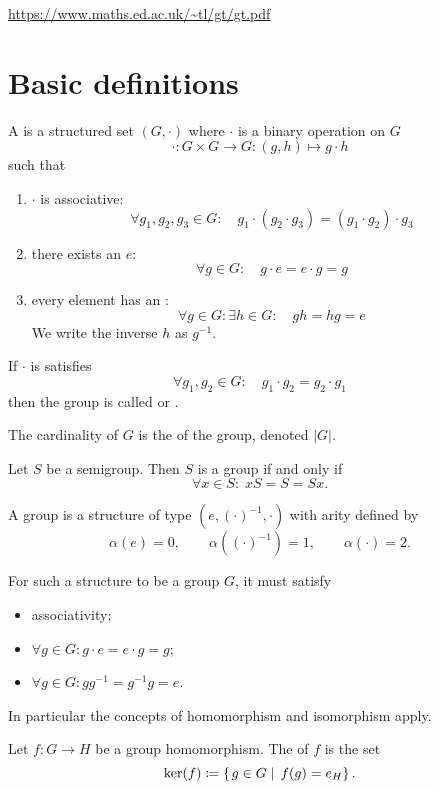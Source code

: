 \url{https://www.maths.ed.ac.uk/~tl/gt/gt.pdf}

\section{Basic definitions}

\begin{definition}
A  is a structured set $(G,\boldsymbol{\cdot})$ where $\boldsymbol{\cdot}$ is a binary operation on $G$
\[\boldsymbol{\cdot}: G\times G \to G: (g,h)\mapsto g\cdot h\]
such that
\begin{enumerate}
\item $\boldsymbol{\cdot}$ is associative:
\[ \forall g_1,g_2,g_3 \in G: \quad g_1\cdot (g_2\cdot g_3) = (g_1\cdot g_2)\cdot g_3 \]
\item there exists an  $e$:
\[ \forall g\in G: \quad g\cdot e = e\cdot g = g \]
\item every element has an :
\[ \forall g\in G: \exists h \in G: \quad  gh = hg = e \]
We write the inverse $h$ as $g^{-1}$. 
\end{enumerate}
If $\boldsymbol{\cdot}$ is satisfies
\[ \forall g_1, g_2 \in G: \quad g_1 \cdot g_2 = g_2\cdot g_1 \]
then the group is called  or .

The cardinality of $G$ is the  of the group, denoted $|G|$.
\end{definition}

\begin{lemma}
Let $S$ be a semigroup. Then $S$ is a group \textup{if and only if}
\[ \forall x\in S: \; xS = S = Sx. \]
\end{lemma}

\begin{lemma}
A group is a structure of type $(e, (\cdot)^{-1}, \boldsymbol{\cdot})$ with arity defined by
\[ \alpha(e) = 0, \qquad \alpha((\cdot)^{-1}) = 1, \qquad \alpha(\boldsymbol{\cdot}) = 2. \]
\end{lemma}
For such a structure to be a group $G$, it must satisfy
\begin{itemize}
\item associativity;
\item $\forall g\in G: g\cdot e = e\cdot g = g$;
\item $\forall g\in G: gg^{-1} = g^{-1}g = e$.
\end{itemize}
In particular the concepts of homomorphism and isomorphism apply.

\begin{definition}
Let $f:G\to H$ be a group homomorphism. The  of $f$ is the set
\[ \ker(f) \coloneqq \left\{\left. g\in G \;\right|\; f(g)=e_H \right\}. \]
\end{definition}


